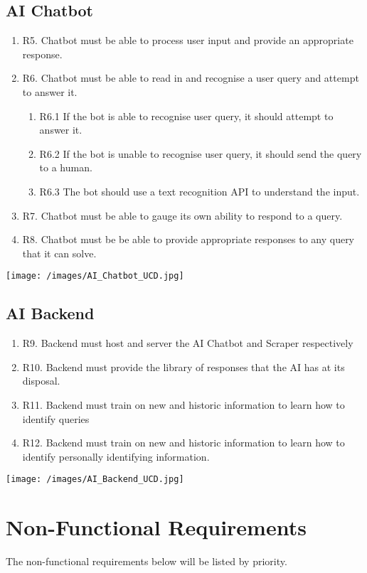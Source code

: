 \documentclass[11pt]{article}
\begin{document}
\subsection{AI Chatbot}
\begin{enumerate}
    \item R5. Chatbot must be able to process user input and provide an appropriate response.
    \item R6. Chatbot must be able to read in and recognise a user query and attempt to answer it.
    \begin{enumerate}
        \item R6.1 If the bot is able to recognise user query, it should attempt to answer it.
        \item R6.2 If the bot is unable to recognise user query, it should send the query to a human.
        \item R6.3 The bot should use a text recognition API to understand the input.
    \end{enumerate}
    \item R7. Chatbot must be able to gauge its own ability to respond to a query.
    \item R8. Chatbot must be be able to provide appropriate responses to any query that it can solve.
\end{enumerate}
\texttt{[image: /images/AI\_Chatbot\_UCD.jpg]}
\subsection{AI Backend}
\begin{enumerate}
    \item R9. Backend must host and server the AI Chatbot and Scraper respectively
    \item R10. Backend must provide the library of responses that the AI has at its disposal.
    \item R11. Backend must train on new and historic information to learn how to identify queries
    \item R12. Backend must train on new and historic information to learn how to identify personally identifying information.
\end{enumerate}
\texttt{[image: /images/AI\_Backend\_UCD.jpg]}
\section{Non-Functional Requirements}
The non-functional requirements below will be listed by priority.
\end{document}
